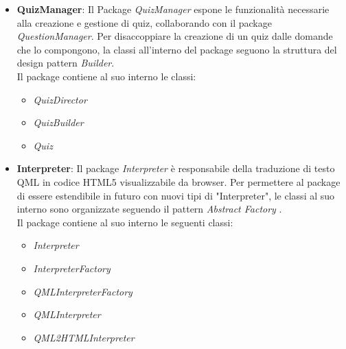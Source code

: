 \begin{itemize}
	\item\textbf{QuizManager}:
	Il Package \emph{QuizManager} espone le funzionalità necessarie alla creazione e gestione di quiz, collaborando con il package \emph{QuestionManager}. Per disaccoppiare la creazione di un quiz dalle domande che lo compongono, la classi all'interno del package seguono la struttura del design pattern \emph{Builder}.\\ 
	Il package contiene al suo interno le classi:
	\begin{itemize}
		\item \textit{QuizDirector}
		\item \textit{QuizBuilder}
		\item \textit{Quiz}
	\end{itemize}
	
	\item \textbf{Interpreter}:
	Il package \emph{Interpreter} è responsabile della traduzione di testo QML in codice HTML5 visualizzabile da browser. Per permettere al package di essere estendibile in futuro con nuovi tipi di "Interpreter", le classi al suo interno sono organizzate seguendo il pattern \emph{Abstract Factory} . \\
	Il package contiene al suo interno le seguenti classi:
	\begin{itemize}
	\item \textit{Interpreter}
	\item \textit{InterpreterFactory}
	\item \textit{QMLInterpreterFactory}
	\item \textit{QMLInterpreter}
	\item \textit{QML2HTMLInterpreter}
	\end{itemize}
	
	\end{itemize}